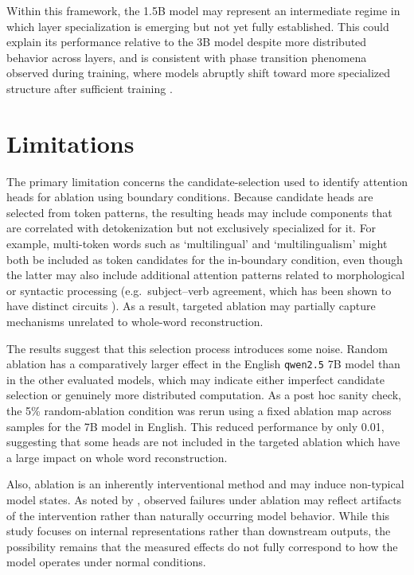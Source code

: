 Within this framework, the 1.5B model may represent an intermediate regime in which layer specialization is emerging but not yet fully established. This could explain its performance relative to the 3B model despite more distributed behavior across layers, and is consistent with phase transition phenomena observed during training, where models abruptly shift toward more specialized structure after sufficient training \citep{elhage2022b,power2022}.

\section{Limitations}\label{sec:discussion_limitations}

The primary limitation concerns the candidate-selection used to identify attention heads for ablation using boundary conditions. Because candidate heads are selected from token patterns, the resulting heads may include components that are correlated with detokenization but not exclusively specialized for it. For example, multi-token words such as `multilingual' and `multilingualism' might both be included as token candidates for the in-boundary condition, even though the latter may also include additional attention patterns related to morphological or syntactic processing (e.g.\ subject--verb agreement, which has been shown to have distinct circuits \citealp{ferrando2024similarity}). As a result, targeted ablation may partially capture mechanisms unrelated to whole-word reconstruction.

The results suggest that this selection process introduces some noise. Random ablation has a comparatively larger effect in the English \texttt{qwen2.5} 7B model than in the other evaluated models, which may indicate either imperfect candidate selection or genuinely more distributed computation. As a post hoc sanity check, the 5\% random-ablation condition was rerun using a fixed ablation map across samples for the 7B model in English. This reduced performance by only 0.01, suggesting that some heads are not included in the targeted ablation which have a large impact on whole word reconstruction.

Also, ablation is an inherently interventional method and may induce non-typical model states. As noted by \citet{hase2021}, observed failures under ablation may reflect artifacts of the intervention rather than naturally occurring model behavior. While this study focuses on internal representations rather than downstream outputs, the possibility remains that the measured effects do not fully correspond to how the model operates under normal conditions.

